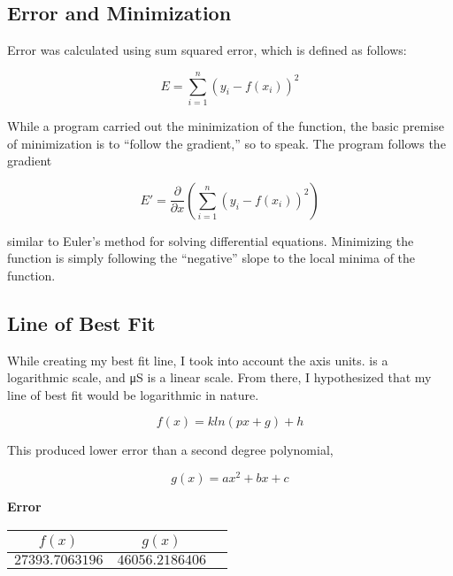 \documentclass[a4paper]{article}
\newcommand{\pH}{\text{pH}}
\begin{document}
        \subsection{Error and Minimization}
            \centerline{Error was calculated using sum squared error, which is defined as follows:}
            \begin{equation}
                E=\displaystyle\sum_{i=1}^n{(y_i-f(x_i))^2}
            \end{equation}
            \begin{center}
                While a program carried out the minimization of the function, the basic
                premise of minimization is to ``follow the gradient,'' so to speak. The
                program follows the gradient
            \end{center}
            \begin{equation}
                E'=\frac{\partial}{\partial x}(\displaystyle\sum_{i=1}^n{(y_i-f(x_i))^2})
            \end{equation}
            \begin{center}
                similar to Euler's method for solving differential equations. Minimizing
                the function is simply following the ``negative'' slope to the local minima
                of the function.
            \end{center}
        \subsection{Line of Best Fit}
            \begin{center}
                While creating my best fit line, I took into account the axis units.
                \pH{} is a logarithmic scale, and \si{\micro\siemens} is a linear
                scale. From there, I hypothesized that my line of best fit would be
                logarithmic in nature.
            \end{center}
            \begin{equation}
                f(x)=kln(px+g)+h
            \end{equation}
            \centerline{This produced lower error than a second degree polynomial,}
            \begin{equation}
                g(x)=ax^2+bx+c
            \end{equation}
            \begin{center}
                \bf{Error}
                \\
                \begin{tabular}{|c|c|c|}
                    \hline
                    $f(x)$ & $g(x)$
                    \\\hline
                    $27393.7063196$ & $46056.2186406$
                    \\\hline
                \end{tabular}
            \end{center}
\end{document}
